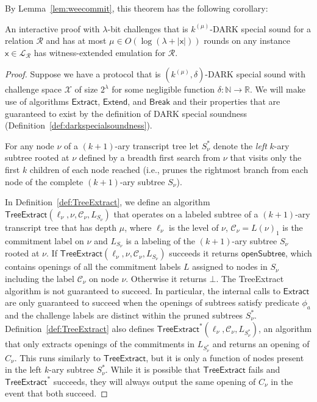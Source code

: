 By Lemma~\ref{lem:weecommit}, this theorem has the following corollary:
\begin{corollary}
\label{cor:dsstowee}
An interactive proof with $\lambda$-bit challenges that is $k^{(\mu)}$-DARK special sound for a relation $\mathcal{R}$ and has at most $\mu \in O(\log(\lambda + |\mathsf{x}|))$ rounds on any instance $\mathsf{x} \in \mathcal{L}_\mathcal{R}$ has witness-extended emulation for $\mathcal{R}$.  
\end{corollary}



\begin{proof} 
Suppose we have a protocol that is $(k^{(\mu)}, \delta)$-DARK special sound with challenge space $\mathcal{X}$ of size $2^\lambda$ for some negligible function $\delta: \mathbb{N} \rightarrow \mathbb{R}$. We will make use of algorithms $\textsf{Extract}$, $\textsf{Extend}$, and $\textsf{Break}$ and their properties that are guaranteed to exist by the definition of DARK special soundness (Definition~\ref{def:darkspecialsoundness}). 

For any node $\nu$ of a $(k+1)$-ary transcript tree let $S^*_\nu$ denote the \emph{left} $k$-ary subtree rooted at $\nu$ defined by a breadth first search from $\nu$ that visits only the first $k$ children of each node reached (i.e., prunes the rightmost branch from each node of the complete $(k+1)$-ary subtree $S_\nu$).

In Definition~\ref{def:TreeExtract}, we define an algorithm $\textsf{TreeExtract}(\ell_\nu, \nu, \mathcal{C}_\nu, L_{S_\nu})$ that operates on a labeled subtree of a $(k+1)$-ary transcript tree that has depth $\mu$,  where $\ell_\nu$ is the level of $\nu$, $\mathcal{C}_\nu = L(\nu)_1$ is the commitment label on $\nu$ and $L_{S_\nu}$ is a labeling of the $(k+1)$-ary subtree $S_\nu$ rooted at $\nu$. If $\textsf{TreeExtract}(\ell_\nu, \nu, \mathcal{C}_\nu, L_{S_\nu})$ succeeds it returns $\textsf{openSubtree}$, which contains openings of all the commitment labels $L$ assigned to nodes in $S_\nu$ including the label $\mathcal{C}_\nu$ on node $\nu$. Otherwise it returns $\bot$. The \textsf{TreeExtract} algorithm is not guaranteed to succeed. In particular, the internal calls to $\textsf{Extract}$ are only guaranteed to succeed when the openings of subtrees satisfy predicate $\phi_a$ and the challenge labels are distinct within the pruned subtrees $S^*_\nu$. Definition~\ref{def:TreeExtract} also defines $\textsf{TreeExtract}^*(\ell_\nu, \mathcal{C}_\nu, L_{S^*_\nu})$, an algorithm that only extracts openings of the commitments in $L_{S^*_\nu}$ and returns an opening of $C_\nu$. This runs similarly to $\textsf{TreeExtract}$, but it is only a function of nodes present in the left $k$-ary subtree $S^*_\nu$. While it is possible that $\textsf{TreeExtract}$ fails and $\textsf{TreeExtract}^*$ succeeds, they will always output the same opening of $C_\nu$ in the event that both succeed.


\end{proof}

